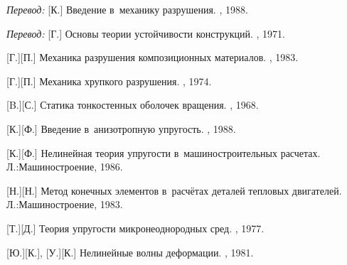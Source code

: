 \begin{thebibliography}{123}
\begin{otherlanguage}{russian}
\emph{Перевод:} [К.] Введение в~механику разрушения. \mirpublisher, 1988. 

\emph{Перевод:} [Г.] Основы теории устойчивости конструкций. \mirpublisher, 1971. 

[Г.][П.] Механика разрушения композиционных материалов. \naukapublisher, 1983. 

[Г.][П.] Механика хрупкого разрушения. \naukapublisher, 1974. 

[B.][С.] Статика тонкостенных оболочек вращения. \naukapublisher, 1968. 

[К.][Ф.] Введение в~анизотропную упругость. \naukapublisher, 1988. 

[К.][Ф.] Нелинейная теория упругости в~машиностроительных расчетах. Л.:\;Машино\-строение, 1986. 

[Н.][Н.] Метод конечных элементов в~расчётах деталей тепловых двигателей. Л.:\;Машино\-строение, 1983. 

[Т.][Д.] Теория упругости микронеоднородных сред. \naukapublisher, 1977. 

[Ю.][К.], [У.][К.] Нелинейные волны деформации. \naukapublisher, 1981. 

%
%




\end{otherlanguage}
\end{thebibliography}
